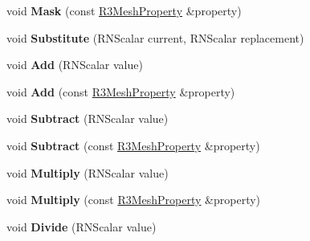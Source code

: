 \begin{DoxyCompactItemize}
\item 
void {\bfseries Mask} (const \hyperlink{struct_r3_mesh_property}{R3\+Mesh\+Property} \&property)\hypertarget{struct_r3_mesh_property_a91fc173189b71e1a276084f0952b72dd}{}\label{struct_r3_mesh_property_a91fc173189b71e1a276084f0952b72dd}

\item 
void {\bfseries Substitute} (R\+N\+Scalar current, R\+N\+Scalar replacement)\hypertarget{struct_r3_mesh_property_a399b9161c4352ecd39f6143f46420ca1}{}\label{struct_r3_mesh_property_a399b9161c4352ecd39f6143f46420ca1}

\item 
void {\bfseries Add} (R\+N\+Scalar value)\hypertarget{struct_r3_mesh_property_a20bf34309981c44c350918ad72015bdc}{}\label{struct_r3_mesh_property_a20bf34309981c44c350918ad72015bdc}

\item 
void {\bfseries Add} (const \hyperlink{struct_r3_mesh_property}{R3\+Mesh\+Property} \&property)\hypertarget{struct_r3_mesh_property_adbc26b6b2c4a2f0cf48c19bd5c708fe8}{}\label{struct_r3_mesh_property_adbc26b6b2c4a2f0cf48c19bd5c708fe8}

\item 
void {\bfseries Subtract} (R\+N\+Scalar value)\hypertarget{struct_r3_mesh_property_af3cff6a6013dd3993a0aab447a1aafc8}{}\label{struct_r3_mesh_property_af3cff6a6013dd3993a0aab447a1aafc8}

\item 
void {\bfseries Subtract} (const \hyperlink{struct_r3_mesh_property}{R3\+Mesh\+Property} \&property)\hypertarget{struct_r3_mesh_property_a218691f8709f38af0165350f208b5f89}{}\label{struct_r3_mesh_property_a218691f8709f38af0165350f208b5f89}

\item 
void {\bfseries Multiply} (R\+N\+Scalar value)\hypertarget{struct_r3_mesh_property_aeebf65c55d563f088a56de17522bc67b}{}\label{struct_r3_mesh_property_aeebf65c55d563f088a56de17522bc67b}

\item 
void {\bfseries Multiply} (const \hyperlink{struct_r3_mesh_property}{R3\+Mesh\+Property} \&property)\hypertarget{struct_r3_mesh_property_af29ade636bcfa2c2be89b40156e6635b}{}\label{struct_r3_mesh_property_af29ade636bcfa2c2be89b40156e6635b}

\item 
void {\bfseries Divide} (R\+N\+Scalar value)\hypertarget{struct_r3_mesh_property_a7a8762a75572f906a3c839eb32a012e1}{}\label{struct_r3_mesh_property_a7a8762a75572f906a3c839eb32a012e1}


\end{DoxyCompactItemize}
